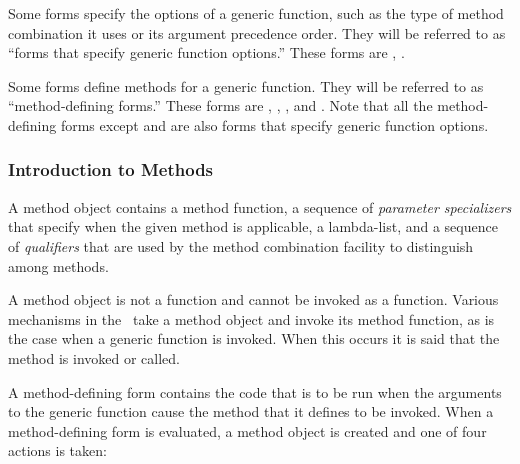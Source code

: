 Some forms specify the options of a generic function,
such as the type of method combination it uses or its argument
precedence order.  They will be referred to as ``forms that
specify generic function options.'' These forms are ,
. %

Some forms define methods for a generic function.  They will be
referred to as ``method-defining forms.'' These forms are 
, , , 
and . Note that all the method-defining forms except 
 and 
are also forms that specify generic function options.

\subsubsection{Introduction to Methods}
\label{Introduction-to-Methods-SECTION}

A method object contains a method function, a sequence of \emph{parameter
  specializers} that specify when the given method is 
applicable, a lambda-list, and a sequence of \emph{qualifiers} that
are used by the method combination facility to distinguish among
methods.

A method object is not a function and cannot be invoked as a function. 
Various mechanisms in the \OS\ take a method object and invoke its method
function, as is the case when a generic function is invoked.  When this
occurs it is said that the method is invoked or called.

A method-defining form contains the code that is to be run when the
arguments to the generic function cause the method that it defines to
be invoked.  When a method-defining form is evaluated, a method object
is created and one of four actions is taken:

